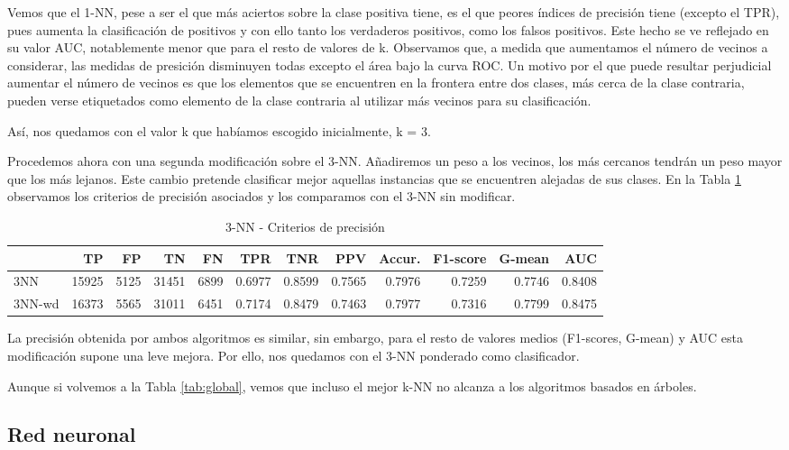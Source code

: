 \documentclass[a4paper, 20pt]{article}
\begin{document}
Vemos que el 1-NN, pese a ser el que más aciertos sobre la clase positiva tiene, es el que peores índices de precisión tiene (excepto el TPR), pues aumenta la clasificación de positivos y con ello tanto los verdaderos positivos, como los falsos positivos. Este hecho se ve reflejado en su valor AUC, notablemente menor que para el resto de valores de k. 
Observamos que, a medida que aumentamos el número de vecinos a considerar, las medidas de presición disminuyen todas excepto el área bajo la curva ROC. Un motivo por el que puede resultar perjudicial aumentar el número de vecinos es que los elementos que se encuentren en la frontera entre dos clases, más cerca de la clase contraria, pueden verse etiquetados como elemento de la clase contraria al utilizar más vecinos para su clasificación.

Así, nos quedamos con el valor k que habíamos escogido inicialmente, k = 3.

Procedemos ahora con una segunda modificación sobre el 3-NN. Añadiremos un peso a los vecinos, los más cercanos tendrán un peso mayor que los más lejanos. Este cambio pretende clasificar mejor aquellas instancias que se encuentren alejadas de sus clases. En la Tabla \ref{tab:knnwd} observamos los criterios de precisión asociados y los comparamos con el 3-NN sin modificar.

\begin{table}[H]
\centering
\caption{3-NN - Criterios de precisión}
\label{tab:knnwd}
\begin{tabular}{lrrrrrrrrrrr}
\toprule
 & TP & FP & TN & FN & TPR & TNR & PPV & Accur. & F1-score & G-mean & AUC\\ \midrule
3NN & 15925 & 5125 & 31451 & 6899 & 0.6977 & 0.8599 & 0.7565 & 0.7976 & 0.7259 & 0.7746 & 0.8408\\
3NN-wd & 16373 & 5565 & 31011 & 6451 & 0.7174 & 0.8479 & 0.7463 & 0.7977 & 0.7316 & 0.7799 & 0.8475\\
\bottomrule
\end{tabular}
\end{table}

La precisión obtenida por ambos algoritmos es similar, sin embargo, para el resto de valores medios (F1-scores, G-mean) y AUC esta modificación supone una leve mejora. Por ello, nos quedamos con el 3-NN ponderado como clasificador.

Aunque si volvemos a la Tabla \ref{tab:global}, vemos que incluso el mejor k-NN no alcanza a los algoritmos basados en árboles.

\subsection{Red neuronal}
\end{document}
